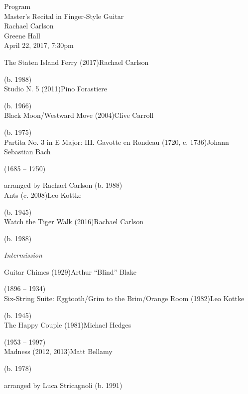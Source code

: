 \documentclass{tufte-handout}
\begin{document}
\begin{fullwidth}
\begin{center}
  Program\\
  Master's Recital in Finger-Style Guitar\\
  Rachael Carlson\\
  Greene Hall\\
  April 22, 2017, 7:30pm
\end{center}
\noindent The Staten Island Ferry (2017)\dotfill Rachael Carlson\\
\strut\hfill (b. 1988)\\

\noindent Studio N. 5 (2011)\dotfill Pino Forastiere\\
\strut\hfill (b. 1966)\\

\noindent Black Moon/Westward Move (2004)\dotfill Clive Carroll\\
\strut \hfill (b. 1975)\\

\noindent Partita No. 3 in E Major: III. Gavotte en Rondeau (1720, c. 1736)\dotfill Johann Sebastian Bach\\
\strut \hfill (1685 -- 1750)\\
\strut\hfill arranged by Rachael Carlson (b. 1988)\\

\noindent Ants (c. 2008)\dotfill Leo Kottke\\
\strut\hfill (b. 1945)\\

\noindent Watch the Tiger Walk (2016)\dotfill Rachael Carlson\\
\strut\hfill (b. 1988)\\

\begin{center}
  \emph{Intermission}
\end{center}

\noindent Guitar Chimes (1929)\dotfill Arthur ``Blind'' Blake\\
\strut\hfill (1896 -- 1934)\\

\noindent Six-String Suite: Eggtooth/Grim to the Brim/Orange Room (1982)\dotfill Leo Kottke\\
\strut\hfill (b. 1945)\\

\noindent The Happy Couple (1981)\dotfill Michael Hedges\\
\strut\hfill (1953 -- 1997)\\

\noindent Madness (2012, 2013)\dotfill Matt Bellamy\\
\strut\hfill (b. 1978)\\
\strut\hfill arranged by Luca Stricagnoli (b. 1991)\\
\end{fullwidth}
\end{document}
